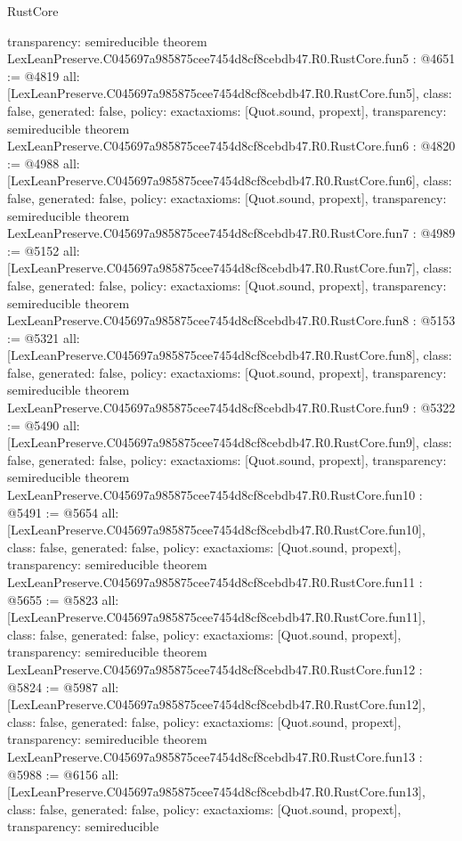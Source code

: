 \begin{lexlean}{RustCore}
\begin{coremodule}
{  transparency: semireducible
}
theorem LexLeanPreserve.C045697a985875cee7454d8cf8cebdb47.R0.RustCore.fun5 : @4651 := @4819 {
  all: [LexLeanPreserve.C045697a985875cee7454d8cf8cebdb47.R0.RustCore.fun5],
  class: false,
  generated: false,
  policy: exact{axioms: [Quot.sound, propext]},
  transparency: semireducible
}
theorem LexLeanPreserve.C045697a985875cee7454d8cf8cebdb47.R0.RustCore.fun6 : @4820 := @4988 {
  all: [LexLeanPreserve.C045697a985875cee7454d8cf8cebdb47.R0.RustCore.fun6],
  class: false,
  generated: false,
  policy: exact{axioms: [Quot.sound, propext]},
  transparency: semireducible
}
theorem LexLeanPreserve.C045697a985875cee7454d8cf8cebdb47.R0.RustCore.fun7 : @4989 := @5152 {
  all: [LexLeanPreserve.C045697a985875cee7454d8cf8cebdb47.R0.RustCore.fun7],
  class: false,
  generated: false,
  policy: exact{axioms: [Quot.sound, propext]},
  transparency: semireducible
}
theorem LexLeanPreserve.C045697a985875cee7454d8cf8cebdb47.R0.RustCore.fun8 : @5153 := @5321 {
  all: [LexLeanPreserve.C045697a985875cee7454d8cf8cebdb47.R0.RustCore.fun8],
  class: false,
  generated: false,
  policy: exact{axioms: [Quot.sound, propext]},
  transparency: semireducible
}
theorem LexLeanPreserve.C045697a985875cee7454d8cf8cebdb47.R0.RustCore.fun9 : @5322 := @5490 {
  all: [LexLeanPreserve.C045697a985875cee7454d8cf8cebdb47.R0.RustCore.fun9],
  class: false,
  generated: false,
  policy: exact{axioms: [Quot.sound, propext]},
  transparency: semireducible
}
theorem LexLeanPreserve.C045697a985875cee7454d8cf8cebdb47.R0.RustCore.fun10 : @5491 := @5654 {
  all: [LexLeanPreserve.C045697a985875cee7454d8cf8cebdb47.R0.RustCore.fun10],
  class: false,
  generated: false,
  policy: exact{axioms: [Quot.sound, propext]},
  transparency: semireducible
}
theorem LexLeanPreserve.C045697a985875cee7454d8cf8cebdb47.R0.RustCore.fun11 : @5655 := @5823 {
  all: [LexLeanPreserve.C045697a985875cee7454d8cf8cebdb47.R0.RustCore.fun11],
  class: false,
  generated: false,
  policy: exact{axioms: [Quot.sound, propext]},
  transparency: semireducible
}
theorem LexLeanPreserve.C045697a985875cee7454d8cf8cebdb47.R0.RustCore.fun12 : @5824 := @5987 {
  all: [LexLeanPreserve.C045697a985875cee7454d8cf8cebdb47.R0.RustCore.fun12],
  class: false,
  generated: false,
  policy: exact{axioms: [Quot.sound, propext]},
  transparency: semireducible
}
theorem LexLeanPreserve.C045697a985875cee7454d8cf8cebdb47.R0.RustCore.fun13 : @5988 := @6156 {
  all: [LexLeanPreserve.C045697a985875cee7454d8cf8cebdb47.R0.RustCore.fun13],
  class: false,
  generated: false,
  policy: exact{axioms: [Quot.sound, propext]},
  transparency: semireducible
}
\end{coremodule}
\end{lexlean}

